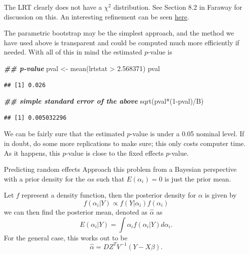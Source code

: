\documentclass[
  ignorenonframetext,
]{beamer}
\newenvironment{Shaded}{\begin{snugshade}}{\end{snugshade}}
\newcommand{\DecValTok}[1]{\textcolor[rgb]{0.00,0.00,0.81}{#1}}
\newcommand{\DocumentationTok}[1]{\textcolor[rgb]{0.56,0.35,0.01}{\textbf{\textit{#1}}}}
\newcommand{\FloatTok}[1]{\textcolor[rgb]{0.00,0.00,0.81}{#1}}
\newcommand{\FunctionTok}[1]{\textcolor[rgb]{0.00,0.00,0.00}{#1}}
\newcommand{\NormalTok}[1]{#1}
\newcommand{\OtherTok}[1]{\textcolor[rgb]{0.56,0.35,0.01}{#1}}
\newcommand{\SpecialCharTok}[1]{\textcolor[rgb]{0.00,0.00,0.00}{#1}}
\begin{document}
\begin{frame}[fragile]{}
\protect\hypertarget{section-7}{}
The LRT clearly does not have a \(\chi^2\) distribution. See Section 8.2
in Faraway for discussion on this. An interesting refinement can be seen
\href{https://www.sciencedirect.com/science/article/pii/S0167947307004306?casa_token=z-BkV1gXcLQAAAAA:FbUGOMy6WR2WFBfIZ2e1OfpJBpzhhQd4zc3OFtNjUGiaCdlXKa4yQOwbw3xcgPXQ-JaZMbUuLQ}{here}.

The parametric bootstrap may be the simplest approach, and the method we
have used above is transparent and could be computed much more
efficiently if needed. With all of this in mind the estimated
\(p\)-value is

\vspace{12pt}
\tiny

\begin{Shaded}
\begin{Highlighting}[]
\DocumentationTok{\#\# p{-}value}
\NormalTok{pval }\OtherTok{\textless{}{-}} \FunctionTok{mean}\NormalTok{(lrtstat }\SpecialCharTok{\textgreater{}} \FloatTok{2.568371}\NormalTok{)}
\NormalTok{pval}
\end{Highlighting}
\end{Shaded}

\begin{verbatim}
## [1] 0.026
\end{verbatim}

\begin{Shaded}
\begin{Highlighting}[]
\DocumentationTok{\#\# simple standard error of the above}
\FunctionTok{sqrt}\NormalTok{(pval}\SpecialCharTok{*}\NormalTok{(}\DecValTok{1}\SpecialCharTok{{-}}\NormalTok{pval)}\SpecialCharTok{/}\NormalTok{B)}
\end{Highlighting}
\end{Shaded}

\begin{verbatim}
## [1] 0.005032296
\end{verbatim}

\vspace{12pt}
\normalsize

We can be fairly sure that the estimated \(p\)-value is under a 0.05
nominal level. If in doubt, do some more replications to make sure; this
only costs computer time. As it happens, this \(p\)-value is close to
the fixed effects \(p\)-value.
\end{frame}

\begin{frame}{Predicting random effects}
\protect\hypertarget{predicting-random-effects}{}
Approach this problem from a Bayesian perspective with a prior density
for the \(\alpha\)s such that \(E(\alpha_i) = 0\) is just the prior
mean.

Let \(f\) represent a density function, then the posterior density for
\(\alpha\) is given by \[
  f(\alpha_i|Y) \propto f(Y|\alpha_i)f(\alpha_i)
\] we can then find the posterior mean, denoted as \(\hat{\alpha}\) as
\[
  E(\alpha_i|Y) = \int \alpha_i f(\alpha_i|Y) d\alpha_i.
\] For the general case, this works out to be \[
  \hat\alpha = DZ^TV^{-1}(Y - X\beta).
\]
\end{frame}
\end{document}
